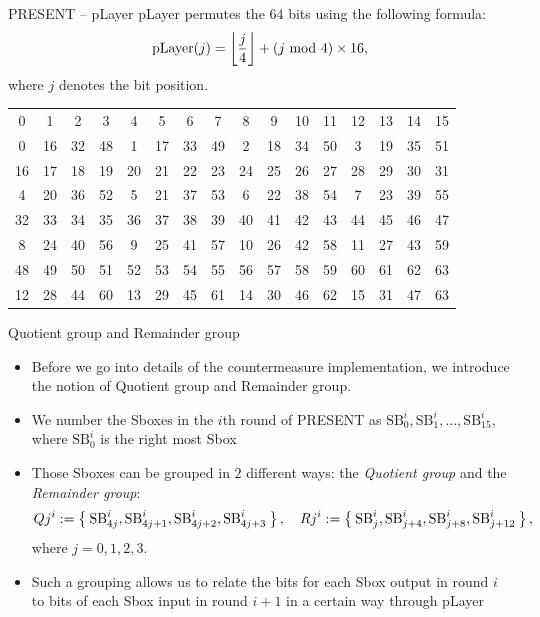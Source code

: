 \begin{frame}{PRESENT -- pLayer}
pLayer permutes the $64$ bits using the following formula:
\[
\text{pLayer}(j)=\left\lfloor\frac{j}{4}\right\rfloor+(j\textrm{~mod~} 4)\times16,
\]
where $j$ denotes the bit position.
\begin{table}[htb]
\centering
\begin{tabular}{cccccccccccccccc}\hline
0 & 1 & 2 & 3 & 4 & 5 & 6 & 7 & 8 & 9 & 10 & 11 & 12 & 13 & 14 & 15 \\
0 & 16 & 32 & 48 & 1 & 17 & 33 & 49 & 2 & 18 & 34 & 50 & 3 & 19 & 35 & 51 \\\hline
16 & 17 & 18 & 19 & 20 & 21 & 22 & 23 & 24 & 25 & 26 & 27 & 28 & 29 & 30 & 31 \\
4 & 20 & 36 & 52 & 5 & 21 & 37 & 53 & 6 & 22 & 38 & 54 & 7 & 23 & 39 & 55 \\\hline
32 & 33 & 34 & 35 & 36 & 37 & 38 & 39 & 40 & 41 & 42 & 43 & 44 & 45 & 46 & 47 \\
8 & 24 & 40 & 56 & 9 & 25 & 41 & 57 & 10 & 26 & 42 & 58 & 11 & 27 & 43 & 59 \\\hline
48 & 49 & 50 & 51 & 52 & 53 & 54 & 55 & 56 & 57 & 58 & 59 & 60 & 61 & 62 & 63 \\
12 & 28 & 44 & 60 & 13 & 29 & 45 & 61 & 14 & 30 & 46 & 62 & 15 & 31 & 47 & 63\\\hline
\end{tabular}
\end{table}
\end{frame}

\begin{frame}{Quotient group and Remainder group}
    \begin{itemize}
        \item Before we go into details of the countermeasure implementation, we introduce the notion of Quotient group and Remainder group.
        \item We number the Sboxes in the $i$th round of PRESENT as $\text{SB}^i_0, \text{SB}^i_1,\dots,\text{SB}^i_{15}$, where $\text{SB}^i_0$ is the right most Sbox
       \item Those Sboxes can be grouped in $2$ different ways: the \textit{Quotient group} and the \textit{Remainder group}:
\[
    Qj^i:=\Set{\text{SB}^i_{4j},\text{SB}^i_{4j+1},\text{SB}^i_{4j+2},\text{SB}^i_{4j+3}},\quad Rj^i:=\Set{\text{SB}^i_{j},\text{SB}^i_{j+4},\text{SB}^i_{j+8},\text{SB}^i_{j+12}},
\]
where $j=0,1,2,3$.
\item Such a grouping allows us to relate the bits for each Sbox output in round $i$ to bits of each Sbox input in round $i+1$ in a certain way through pLayer
    \end{itemize}
\end{frame}

